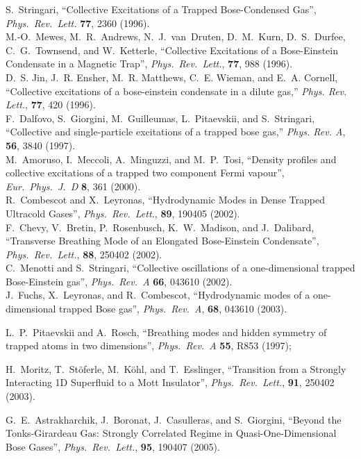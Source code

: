 \documentclass[a4paper, onecolumn]{revtex4-1}
\begin{document}
\begin{thebibliography}{1}
 S.~Stringari, ``Collective Excitations of a Trapped
  Bose-Condensed Gas'', {\em Phys.\ Rev.\ Lett.}  \textbf{77}, 2360 (1996).
%
\\ 
%
M.-O.~Mewes, M.~R.~Andrews, N.~J.~van~Druten, D.~M.~Kurn, D.~S.~Durfee, 
C.~G.~Townsend, and W.~Ketterle, ``Collective Excitations of a Bose-Einstein Condensate in a Magnetic
Trap'', {\em Phys.\ Rev.\ Lett.}, \textbf{77}, 988 (1996).
%
\\ 
%
D.~S. Jin, J.~R. Ensher, M.~R. Matthews, C.~E. Wieman, and E.~A. Cornell,
  ``Collective excitations of a bose-einstein condensate in a dilute gas,''
  {\em Phys. Rev. Lett.}, {\bf 77}, 420 (1996).
%
\\
%
F.~Dalfovo, S.~Giorgini, M.~Guilleumas, L.~Pitaevskii, and S.~Stringari,
  ``Collective and single-particle excitations of a trapped bose gas,'' {\em
  Phys. Rev. A}, {\bf 56}, 3840 (1997).
%
\\
%
M.~Amoruso, I.~Meccoli, A.~Minguzzi, and M.~P.~Tosi,  ``Density profiles and collective excitations of
a trapped two component Fermi vapour'', {\em Eur.\ Phys.\ J.~D} \textbf{8}, 361 (2000).
%
\\ 
%
R.~Combescot and X.~Leyronas, 
``Hydrodynamic Modes in Dense Trapped Ultracold Gases'', {\em Phys.\ Rev.\ Lett.}, \textbf{89}, 190405 (2002).
%
\\ 
%
F.~Chevy, V.~Bretin, P.~Rosenbusch, K.~W.~Madison, and J.~Dalibard, 
``Transverse Breathing Mode of an Elongated Bose-Einstein Condensate'', 
{\em Phys.\ Rev.\ Lett.}, \textbf{88}, 250402 (2002).
%
\\ 
%
C.~Menotti and S.~Stringari, ``Collective oscillations of a one-dimensional trapped Bose-Einstein
gas'', {\em Phys.\ Rev.\ A} \textbf{66}, 043610 (2002).
%
\\ 
%
J.~Fuchs, X.~Leyronas, and R.~Combescot, 
``Hydrodynamic modes of a one-dimensional trapped Bose gas'', 
{\em Phys.\ Rev.\ A}, \textbf{68}, 043610 (2003).


%
L.~P.~Pitaevskii and A.~Rosch, 
``Breathing modes and hidden symmetry of trapped atoms in two
dimensions'', {\em Phys.\ Rev.\ A} \textbf{55}, R853 (1997);

 H.~Moritz, T.~St\"oferle, M.~K\"ohl, and 
T.~Esslinger,
``Transition from a Strongly Interacting 1D Superfluid to a Mott Insulator'',
{\em Phys.\ Rev.\ Lett.}, \textbf{91}, 250402 (2003).

 G.~E.~Astrakharchik, J.~Boronat, J.~Casulleras, and
  S.~Giorgini, ``Beyond the Tonks-Girardeau Gas: Strongly Correlated Regime in Quasi-One-Dimensional
  Bose Gases'', {\em Phys.\ Rev.\ Lett.}, \textbf{95}, 190407 (2005).



\end{thebibliography}
\end{document}
